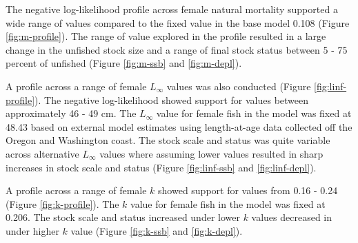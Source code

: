 \documentclass[11pt,
  english,
  a4paper,
]{article}
\begin{document}

The negative log-likelihood profile across female natural mortality supported a wide range of values compared to the fixed value in the base model 0.108 (Figure \ref{fig:m-profile}). The range of value explored in the profile resulted in a large change in the unfished stock size and a range of final stock status between 5 - 75 percent of unfished (Figure \ref{fig:m-ssb} and \ref{fig:m-depl}).

\leavevmode\tagmcend\tagstructend\par


A profile across a range of female {\(L_{\infty}\)\leavevmode\tagmcend\tagstructend} values was also conducted (Figure \ref{fig:linf-profile}). The negative log-likelihood showed support for values between approximately 46 - 49 cm. The {\(L_{\infty}\)\leavevmode\tagmcend\tagstructend} value for female fish in the model was fixed at 48.43 based on external model estimates using length-at-age data collected off the Oregon and Washington coast. The stock scale and status was quite variable across alternative {\(L_{\infty}\)\leavevmode\tagmcend\tagstructend} values where assuming lower values resulted in sharp increases in stock scale and status (Figure \ref{fig:linf-ssb} and \ref{fig:linf-depl}).

\leavevmode\tagmcend\tagstructend\par


A profile across a range of female {\(k\)\leavevmode\tagmcend\tagstructend} showed support for values from 0.16 - 0.24 (Figure \ref{fig:k-profile}). The {\(k\)\leavevmode\tagmcend\tagstructend} value for female fish in the model was fixed at 0.206. The stock scale and status increased under lower {\(k\)\leavevmode\tagmcend\tagstructend} values decreased in under higher {\(k\)\leavevmode\tagmcend\tagstructend} value (Figure \ref{fig:k-ssb} and \ref{fig:k-depl}).

\leavevmode\tagmcend\tagstructend\par
\end{document}
